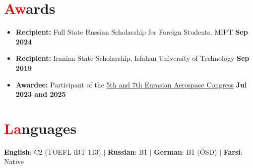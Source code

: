 \documentclass[a4paper, 11pt]{article}
\newcommand{\resumeItem}[1]{
    \item\small{
        {#1 \vspace{-2pt}}
    }
}
\begin{document}
\section{{\textcolor{red}{Aw}ards}}
\begin{itemize}
    \resumeItem{\textbf{Recipient:} Full State Russian Scholarship for Foreign Students, MIPT} \hfill \textbf{Sep 2024}
    \resumeItem{\textbf{Recipient:} Iranian State Scholarship, Isfahan University of Technology} \hfill \textbf{Sep 2019}
    \resumeItem{\textbf{Awardee:} Participant of the \href{https://congress.aero/en/}{5th and 7th Eurasian Aerospace Congress}} \hfill \textbf{Jul 2023 and 2025}

\end{itemize}
\vspace{-15pt}

\section{{\textcolor{red}{La}nguages}}
\begin{center}
    \textbf{English}: C2 (TOEFL iBT 113) \quad $|$ \quad 
    \textbf{Russian}: B1 \quad $|$ \quad 
    \textbf{German}: B1 (ÖSD) \quad $|$ \quad 
    \textbf{Farsi}: Native
\end{center}
\end{document}
